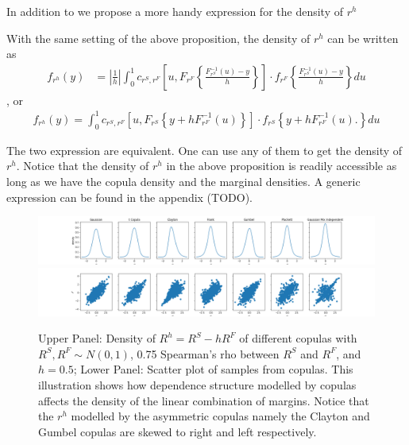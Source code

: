 \documentclass[square]{article} %
\theoremstyle{plain}
\theoremstyle{definition} %
\begin{document}
In addition to \cite{Barbi2014} we propose a more handy expression for the density of $r^h$

\begin{prop} With the same setting of the above proposition, the density of $r^h$ can be written as
  \begin{align}
  f_{r^h}(y) &= \left|\frac{1}{h}\right|\int_0^1 c_{r^S, r^F} \left[u,
  F_{r^F}\left\{\frac{F^{-1}_{r^S}(u)-y}{h}\right\}
  \right]
   \cdot
  f_{r^F}
  \left\{\frac{F^{-1}_{r^S}(u)-y}{h}\right\} du \label{eq:density1}
  \end{align}, or
    \begin{align}
      f_{r^h}(y)
      = \int_0^1 c_{r^S, r^F} \left[u,
      F_{r^S}\left\{y + h F^{-1}_{r^F}(u)\right\}
      \right]
       \cdot
      f_{r^S}
      \left\{
      y+ hF^{-1}_{r^F}(u).
      \right\} du\label{eq:density2}
  \end{align}
  \end{prop}
The two expression are equivalent.
One can use any of them to get the density of $r^h$.
Notice that the density of $r^h$ in the above proposition is readily accessible as long as we have
the copula density and the marginal densities.
A generic expression can be found in the appendix (TODO).
\begin{figure}[h]
\includegraphics[width=\textwidth]{_pics/density illustration1.png}
\includegraphics[width=\textwidth]{_pics/density illustration2.png}
  \caption{Upper Panel: Density of $R^h= R^S - hR^F$ of different copulas with
  $R^S, R^F \sim N(0,1)$,
  0.75 Spearman's rho between $R^S$ and $R^F$, and $h=0.5$;
  Lower Panel: Scatter plot of samples from copulas.
  This illustration shows how dependence structure modelled by copulas affects the density of the linear combination
  of margins.
  Notice that the $r^h$ modelled by the asymmetric copulas namely the Clayton and Gumbel copulas are skewed to right
  and left respectively.}
\label{fig:density illustration}
\end{figure}
\end{document}
